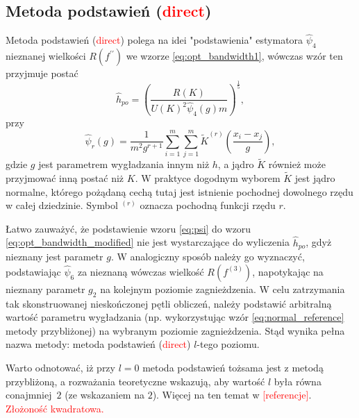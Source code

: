 \subsection*{Metoda podstawień (\textcolor{red}{direct})}

Metoda podstawień (\textcolor{red}{direct}) polega na idei "podstawienia" estymatora $\hat{\psi}_4$ nieznanej wielkości $R(f^{\prime\prime})$ we wzorze \eqref{eq:opt_bandwidth1}, wówczas wzór ten przyjmuje postać
\begin{equation} \label{eq:opt_bandwidth_modified}
\hat{h}_{po} = \left( \frac{R(K)}{U(K)^2 \hat{\psi}_4(g) m} \right)^\frac{1}{5},
\end{equation}
przy
\begin{equation} \label{eq:psi}
\hat{\psi}_r(g) = \frac{1}{m^2 g^{r+1}} \sum_{i=1}^m \sum_{j=1}^m \tilde K^{(r)} \left( \frac{x_i - x_j}{g} \right),
\end{equation}
gdzie $g$ jest parametrem wygładzania innym niż $h$, a jądro $\tilde K$ również może przyjmować inną postać niż $K$. W praktyce dogodnym wyborem $\tilde K$ jest jądro normalne, którego pożądaną cechą tutaj jest istnienie pochodnej dowolnego rzędu w całej dziedzinie. Symbol $^{(r)}$ oznacza pochodną funkcji rzędu $r$.

Łatwo zauważyć, że podstawienie wzoru \eqref{eq:psi} do wzoru \eqref{eq:opt_bandwidth_modified} nie jest wystarczające do wyliczenia $\hat{h}_{po}$, gdyż nieznany jest parametr $g$. W analogiczny sposób należy go wyznaczyć, podstawiając $\hat{\psi}_6$ za nieznaną wówczas wielkość $R(f^{(3)})$, napotykając na nieznany parametr $g_2$ na kolejnym poziomie zagnieżdzenia. W celu zatrzymania tak skonstruowanej nieskończonej pętli obliczeń, należy podstawić arbitralną wartość parametru wygładzania (np. wykorzystując wzór \eqref{eq:normal_reference} metody przybliżonej) na wybranym poziomie zagnieżdzenia. Stąd wynika pełna nazwa metody: metoda podstawień  (\textcolor{red}{direct}) $l$-tego poziomu.

Warto odnotować, iż przy $l=0$ metoda podstawień tożsama jest z metodą przybliżoną, a rozważania teoretyczne wskazują, aby wartość $l$ była równa conajmniej~$2$ (ze wskazaniem na $2$). Więcej na ten temat w \textcolor{red}{[referencje]}. \textcolor{red}{Złożoność kwadratowa.}

